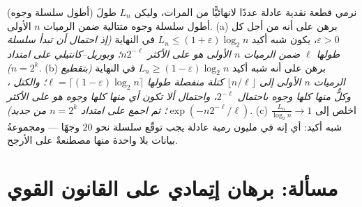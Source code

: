 \begin{exercise}[$\star\star$]\label{exo:b3:probability:12}
(أطول سلسلة وجوه) نرمي قطعة نقدية عادلة عددًا لانهائيًّا من
المرات، وليكن $L_n$ طولَ أطول سلسلة وجوه متتالية ضمن الرميات
$n$ الأولى.
(a) برهن على أنه من أجل كل $\varepsilon > 0$، يكون شبه أكيد $L_n \leq
(1 + \varepsilon)\log_2n$ في
النهاية \emph{(إذ احتمال أن تبدأ سلسلة طولها $\ell$ ضمن
الرميات $n$ الأولى هو على الأكثر $n2^{-\ell}$؛ وبوريل--كانتيلي
على امتداد $n =
2^k$)}.
(b) برهن على أنه شبه أكيد $L_n \geq (1 - \varepsilon)\log_2n$ في النهاية \emph{(بتقطيع
الرميات $n$ الأولى إلى $\lfloor n/\ell\rfloor$ كتلة منفصلة طولها $\ell =
\lceil(1 - \varepsilon)\log_2n\rceil$؛
والكتل ، وكلٌّ منها كلها وجوه باحتمال $2^{-\ell}$،
واحتمال ألا تكون أي منها كلها وجوه هو على الأكثر $\exp(-n2^{-\ell}/\ell)$؛ ثم
اجمع على امتداد $n = 2^k$ من جديد)}.
(c) اخلص إلى $\frac{L_n}{\log_2n} \to 1$ شبه أكيد: أي إنه في مليون رمية عادلة يجب
توقّع سلسلة نحو $20$ وجهًا --- ومجموعةُ بيانات بلا واحدة منها
مصطنعةٌ على الأرجح.
\end{exercise}

\section{مسألة: برهان إتِمادي على القانون القوي}

